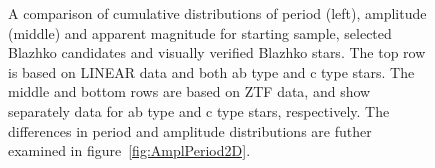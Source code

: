 \begin{figure}[ht]
    \centering
   \caption{A comparison of cumulative distributions of period (left),
   amplitude (middle) and apparent magnitude for starting sample,
   selected Blazhko candidates and visually verified Blazhko
   stars. The top row is based on LINEAR data and both ab type and c
   type stars. The middle and bottom rows are
   based on ZTF data, and show separately data for ab type and c type
   stars, respectively. The differences in period and amplitude
   distributions are futher examined in figure~\ref{fig:AmplPeriod2D}.}
      \label{fig:AmplPeriod}
\end{figure}


